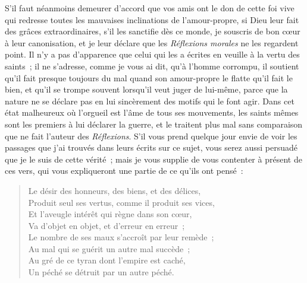 \documentclass[french,twoside]{book} %
\begin{document}
\noindent S’il faut néanmoins demeurer d’accord que vos amis ont le don de cette foi vive qui redresse toutes les mauvaises inclinations de l’amour-propre, si Dieu leur fait des grâces extraordinaires, s’il les sanctifie dès ce monde, je souscris de bon cœur à leur canonisation, et je leur déclare que les {\itshape Réflexions morales} ne les regardent point. Il n’y a pas d’apparence que celui qui les a écrites en veuille à la vertu des saints ; il ne s’adresse, comme je vous ai dit, qu’à l’homme corrompu, il soutient qu’il fait presque toujours du mal quand son amour-propre le flatte qu’il fait le bien, et qu’il se trompe souvent lorsqu’il veut juger de lui-même, parce que la nature ne se déclare pas en lui sincèrement des motifs qui le font agir. Dans cet état malheureux où l’orgueil est l’âme de tous ses mouvements, les saints mêmes sont les premiers à lui déclarer la guerre, et le traitent plus mal sans comparaison que ne fait l’auteur des {\itshape Réflexions}. S’il vous prend quelque jour envie de voir les passages que j’ai trouvés dans leurs écrits sur ce sujet, vous serez aussi persuadé que je le suis de cette vérité ; mais je vous supplie de vous contenter à présent de ces vers, qui vous expliqueront une partie de ce qu’ils ont pensé :\par


\begin{verse}
Le désir des honneurs, des biens, et des délices,\\
Produit seul ses vertus, comme il produit ses vices,\\
Et l’aveugle intérêt qui règne dans son cœur,\\
Va d’objet en objet, et d’erreur en erreur ;\\
Le nombre de ses maux s’accroît par leur remède ;\\
Au mal qui se guérit un autre mal succède ;\\
Au gré de ce tyran dont l’empire est caché,\\
Un péché se détruit par un autre péché.\\
\end{verse}
\end{document}

